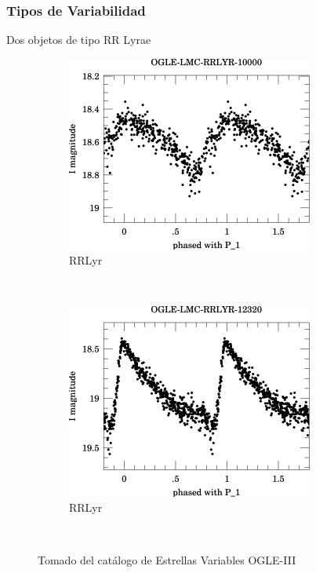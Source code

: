 \documentclass{beamer}
\begin{document}
\begin{frame}
  \frametitle{Tipos de Variabilidad}
  Dos objetos de tipo RR Lyrae
  \begin{figure}
    \centering
    \begin{subfigure}[b]{0.4\textwidth}
      \includegraphics[width=\textwidth]{./img/OGLE-LMC-RRLYR-10000_1.jpg}
      \caption{RRLyr}
    \end{subfigure}%
    ~ %
    \begin{subfigure}[b]{0.4\textwidth}
      \includegraphics[width=\textwidth]{./img/OGLE-LMC-RRLYR-12320_1.jpg}
      \caption{RRLyr}
    \end{subfigure}
    ~ %
    \caption{Tomado del catálogo de Estrellas Variables OGLE-III}
  \end{figure}
\end{frame}
\end{document}
